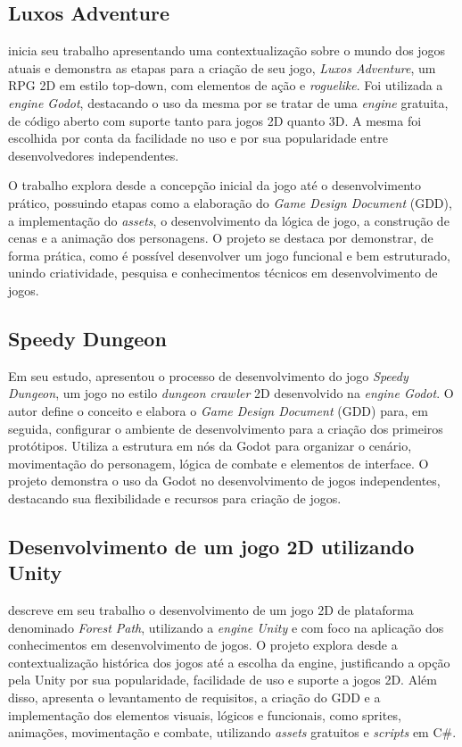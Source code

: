 \subsection{Luxos Adventure}

 inicia seu trabalho apresentando uma contextualização sobre o mundo dos jogos atuais e demonstra as etapas para a criação de seu jogo, \textit{Luxos Adventure}, um RPG 2D em estilo top-down, com elementos de ação e \textit{roguelike}. Foi utilizada a \textit{engine Godot}, destacando o uso da mesma por se tratar de uma \textit{engine} gratuita, de código aberto com suporte tanto para jogos 2D quanto 3D. A mesma foi escolhida por conta da facilidade no uso e por sua popularidade entre desenvolvedores independentes.

O trabalho explora desde a concepção inicial da jogo até o desenvolvimento prático, possuindo etapas como a elaboração do \textit{Game Design Document }(GDD), a implementação do \textit{assets}, o desenvolvimento da lógica de jogo, a construção de cenas e a animação dos personagens. O projeto se destaca por demonstrar, de forma prática, como é possível desenvolver um jogo funcional e bem estruturado, unindo criatividade, pesquisa e conhecimentos técnicos em desenvolvimento de jogos.


\subsection{Speedy Dungeon}

Em seu estudo,  apresentou o processo de desenvolvimento do jogo \textit{Speedy Dungeon}, um jogo no estilo \textit{dungeon crawler} 2D desenvolvido na \textit{engine Godot}. O autor define o conceito e elabora o \textit{Game Design Document }(GDD) para, em seguida, configurar o ambiente de desenvolvimento para a criação dos primeiros protótipos. Utiliza a estrutura em nós da Godot para organizar o cenário, movimentação do personagem, lógica de combate e elementos de interface. O projeto demonstra o uso da Godot no desenvolvimento de jogos independentes, destacando sua flexibilidade e recursos para criação de jogos.

\subsection{Desenvolvimento de um jogo 2D utilizando Unity}

 descreve em seu trabalho o desenvolvimento de um jogo 2D de plataforma denominado \textit{Forest Path}, utilizando a \textit{engine Unity} e com foco na aplicação dos conhecimentos  em desenvolvimento de jogos. O projeto explora desde a contextualização histórica dos jogos até a escolha da engine, justificando a opção pela Unity por sua popularidade, facilidade de uso e suporte a jogos 2D. Além disso, apresenta o levantamento de requisitos, a criação do GDD e a implementação dos elementos visuais, lógicos e funcionais, como sprites, animações, movimentação e combate, utilizando \textit{assets} gratuitos e \textit{scripts} em C\#.
